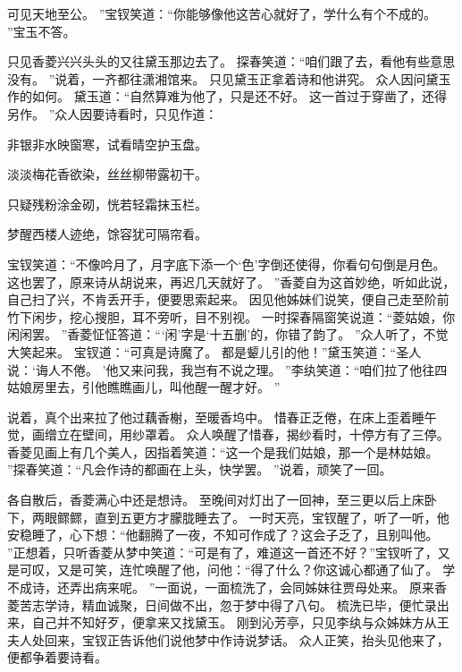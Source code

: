 可见天地至公。
”宝钗笑道：“你能够像他这苦心就好了，学什么有个不成的。
”宝玉不答。
\par
只见香菱兴兴头头的又往黛玉那边去了。
探春笑道：“咱们跟了去，看他有些意思没有。
”说着，一齐都往潇湘馆来。
只见黛玉正拿着诗和他讲究。
众人因问黛玉作的如何。
黛玉道：“自然算难为他了，只是还不好。
这一首过于穿凿了，还得另作。
”众人因要诗看时，只见作道：\par
\hop
非银非水映窗寒，试看晴空护玉盘。
\par
淡淡梅花香欲染，丝丝柳带露初干。
\par
只疑残粉涂金砌，恍若轻霜抹玉栏。
\par
梦醒西楼人迹绝，馀容犹可隔帘看。
\par
\hop
宝钗笑道：“不像吟月了，月字底下添一个‘色’字倒还使得，你看句句倒是月色。
这也罢了，原来诗从胡说来，再迟几天就好了。
”香菱自为这首妙绝，听如此说，自己扫了兴，不肯丢开手，便要思索起来。
因见他姊妹们说笑，便自己走至阶前竹下闲步，挖心搜胆，耳不旁听，目不别视。
一时探春隔窗笑说道：“菱姑娘，你闲闲罢。
”香菱怔怔答道：“‘闲’字是‘十五删’的，你错了韵了。
”众人听了，不觉大笑起来。
宝钗道：“可真是诗魔了。
都是颦儿引的他！”黛玉笑道：“圣人说：‘诲人不倦。
’他又来问我，我岂有不说之理。
”李纨笑道：“咱们拉了他往四姑娘房里去，引他瞧瞧画儿，叫他醒一醒才好。
”\par
说着，真个出来拉了他过藕香榭，至暖香坞中。
惜春正乏倦，在床上歪着睡午觉，画缯立在壁间，用纱罩着。
众人唤醒了惜春，揭纱看时，十停方有了三停。
香菱见画上有几个美人，因指着笑道：“这一个是我们姑娘，那一个是林姑娘。
”探春笑道：“凡会作诗的都画在上头，快学罢。
”说着，顽笑了一回。
\par
各自散后，香菱满心中还是想诗。
至晚间对灯出了一回神，至三更以后上床卧下，两眼鳏鳏，直到五更方才朦胧睡去了。
一时天亮，宝钗醒了，听了一听，他安稳睡了，心下想：“他翻腾了一夜，不知可作成了？这会子乏了，且别叫他。
”正想着，只听香菱从梦中笑道：“可是有了，难道这一首还不好？”宝钗听了，又是可叹，又是可笑，连忙唤醒了他，问他：“得了什么？你这诚心都通了仙了。
学不成诗，还弄出病来呢。
”一面说，一面梳洗了，会同姊妹往贾母处来。
原来香菱苦志学诗，精血诚聚，日间做不出，忽于梦中得了八句。
梳洗已毕，便忙录出来，自己并不知好歹，便拿来又找黛玉。
刚到沁芳亭，只见李纨与众姊妹方从王夫人处回来，宝钗正告诉他们说他梦中作诗说梦话。
众人正笑，抬头见他来了，便都争着要诗看。
